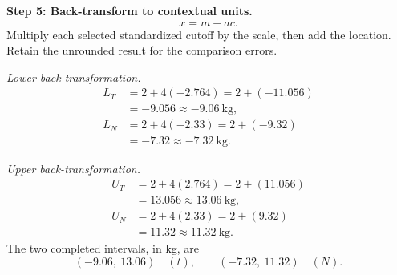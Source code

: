 \begin{enumerate}[leftmargin=*,label=\textbf{\arabic*.},itemsep=12pt,parsep=3pt,topsep=5pt]
\par\noindent\begin{minipage}{\linewidth}
\par\textbf{Step 5: Back-transform to contextual units.}\nopagebreak\enspace \[
x=m+ac.
\]
Multiply each selected standardized cutoff by the scale, then add the location. Retain the unrounded result for the comparison errors.
\par\textit{Lower back-transformation.}
\[
\begin{aligned}L_T&=2+4(-2.764)=2+(-11.056)\\&=-9.056\approx\boxed{-9.06\ \text{kg}},\\L_N&=2+4(-2.33)=2+(-9.32)\\&=-7.32\approx\boxed{-7.32\ \text{kg}}.\end{aligned}
\]
\par\textit{Upper back-transformation.}
\[
\begin{aligned}U_T&=2+4(2.764)=2+(11.056)\\&=13.056\approx\boxed{13.06\ \text{kg}},\\U_N&=2+4(2.33)=2+(9.32)\\&=11.32\approx\boxed{11.32\ \text{kg}}.\end{aligned}
\]
The two completed intervals, in kg, are
\[
\boxed{(-9.06,\ 13.06)\quad(t)},\qquad\boxed{(-7.32,\ 11.32)\quad(N)}.
\]


\end{minipage}
\end{enumerate}

